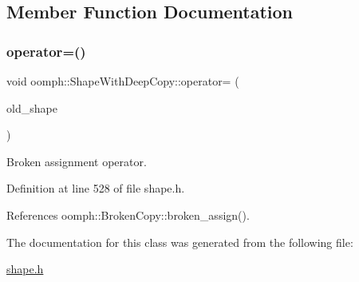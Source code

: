 \subsection{Member Function Documentation}
\mbox{\label{classoomph_1_1ShapeWithDeepCopy_a69b0e32d20d1badf674ff46670a7c32f}} 
\subsubsection{\texorpdfstring{operator=()}{operator=()}}
{\footnotesize\ttfamily void oomph\+::\+Shape\+With\+Deep\+Copy\+::operator= (\begin{DoxyParamCaption}\item[{const \hyperlink{classoomph_1_1ShapeWithDeepCopy}{Shape\+With\+Deep\+Copy} \&}]{old\+\_\+shape }\end{DoxyParamCaption})\hspace{0.3cm}{\ttfamily [inline]}}



Broken assignment operator. 



Definition at line 528 of file shape.\+h.



References oomph\+::\+Broken\+Copy\+::broken\+\_\+assign().



The documentation for this class was generated from the following file\+:\begin{DoxyCompactItemize}
\item 
\hyperlink{shape_8h}{shape.\+h}\end{DoxyCompactItemize}
